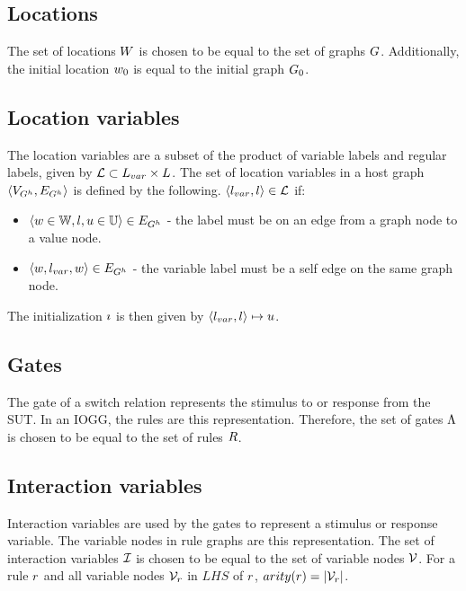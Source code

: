 \subsection{Locations}
The set of locations $W$ is chosen to be equal to the set of graphs $G$. Additionally, the initial location $w_0$ is equal to the initial graph $G_0$.

\subsection{Location variables}
The location variables are a subset of the product of variable labels and regular labels, given by $\mathcal{L} \subset L_{var} \times L$. The set of location variables in a host graph $\langle V_{G^h}, E_{G^h}\rangle$ is defined by the following. $\langle l_{var}, l \rangle \in \mathcal{L}$ if:
\begin{itemize}
\item $\langle w \in \mathbb{W}, l, u \in \mathbb{U} \rangle \in E_{G^h}$ - the label must be on an edge from a graph node to a value node.
\item $\langle w, l_{var}, w \rangle \in E_{G^h}$ - the variable label must be a self edge on the same graph node.
\end{itemize}
The initialization $\imath$ is then given by $\langle l_{var}, l \rangle \mapsto u$.

\subsection{Gates}
The gate of a switch relation represents the stimulus to or response from the SUT. In an IOGG, the rules are this representation. Therefore, the set of gates $\Lambda$ is chosen to be equal to the set of rules $R$.

\subsection{Interaction variables}
Interaction variables are used by the gates to represent a stimulus or response variable. The variable nodes in rule graphs are this representation. The set of interaction variables $\mathcal{I}$ is chosen to be equal to the set of variable nodes $\mathcal{V}$. For a rule $r$ and all variable nodes $\mathcal{V}_r$ in $\mathit{LHS}$ of $r$, $arity(r) = |\mathcal{V}_r|$. %


